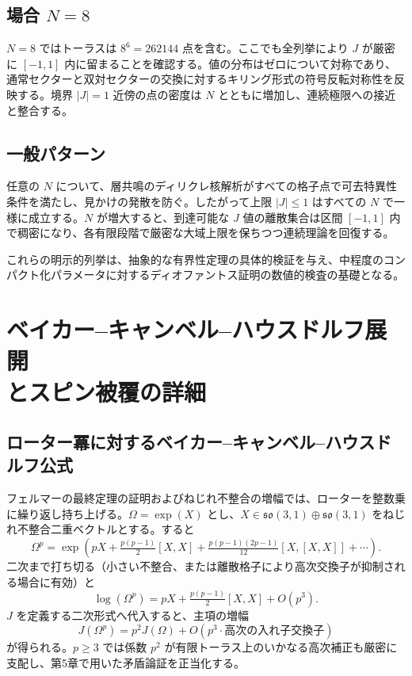 \documentclass[a4paper]{article}
\theoremstyle{definition}
\begin{document}
\subsection{場合 \texorpdfstring{$N = 8$}{N = 8}}

$N = 8$ ではトーラスは $8^6 = 262144$ 点を含む。ここでも全列挙により $J$ が厳密に $[-1,1]$ 内に留まることを確認する。値の分布はゼロについて対称であり、通常セクターと双対セクターの交換に対するキリング形式の符号反転対称性を反映する。境界 $|J| = 1$ 近傍の点の密度は $N$ とともに増加し、連続極限への接近と整合する。

\subsection{一般パターン}

任意の $N$ について、層共鳴のディリクレ核解析がすべての格子点で可去特異性条件を満たし、見かけの発散を防ぐ。したがって上限 $|J| \leq 1$ はすべての $N$ で一様に成立する。$N$ が増大すると、到達可能な $J$ 値の離散集合は区間 $[-1,1]$ 内で稠密になり、各有限段階で厳密な大域上限を保ちつつ連続理論を回復する。

これらの明示的列挙は、抽象的な有界性定理の具体的検証を与え、中程度のコンパクト化パラメータに対するディオファントス証明の数値的検査の基礎となる。

\section[ベイカー--キャンベル--ハウスドルフ展開とスピン被覆]{ベイカー--キャンベル--ハウスドルフ展開\\とスピン被覆の詳細}

\subsection{ローター冪に対するベイカー--キャンベル--ハウスドルフ公式}

フェルマーの最終定理の証明およびねじれ不整合の増幅では、ローターを整数乗に繰り返し持ち上げる。$\Omega = \exp(X)$ とし、$X \in \mathfrak{so}(3,1) \oplus \mathfrak{so}(3,1)$ をねじれ不整合二重ベクトルとする。すると
\[
\Omega^p = \exp(pX + \tfrac{p(p-1)}{2}[X,X] + \tfrac{p(p-1)(2p-1)}{12}[X,[X,X]] + \cdots).
\]
二次まで打ち切る（小さい不整合、または離散格子により高次交換子が抑制される場合に有効）と
\[
\log(\Omega^p) = pX + \tfrac{p(p-1)}{2}[X,X] + O(p^3).
\]
$J$ を定義する二次形式へ代入すると、主項の増幅
\[
J(\Omega^p) = p^2 J(\Omega) + O(p^3 \cdot \text{高次の入れ子交換子})
\]
が得られる。$p \geq 3$ では係数 $p^2$ が有限トーラス上のいかなる高次補正も厳密に支配し、第5章で用いた矛盾論証を正当化する。
\end{document}
